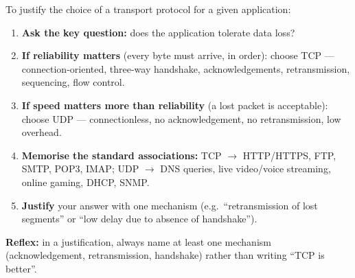 \documentclass[11pt]{article}
\newcommand{\cle}[1]{{\popxbold\color{popdark}#1}}
\begin{document}
\begin{methode}
To justify the choice of a transport protocol for a given application:
\begin{enumerate}
\item \textbf{Ask the key question:} does the application tolerate data loss?
\item \textbf{If reliability matters} (every byte must arrive, in order): choose \cle{TCP} — connection-oriented, three-way handshake, acknowledgements, retransmission, sequencing, flow control.
\item \textbf{If speed matters more than reliability} (a lost packet is acceptable): choose \cle{UDP} — connectionless, no acknowledgement, no retransmission, low overhead.
\item \textbf{Memorise the standard associations:} TCP $\rightarrow$ HTTP/HTTPS, FTP, SMTP, POP3, IMAP; UDP $\rightarrow$ DNS queries, live video/voice streaming, online gaming, DHCP, SNMP.
\item \textbf{Justify} your answer with one mechanism (e.g.\ ``retransmission of lost segments'' or ``low delay due to absence of handshake'').
\end{enumerate}
\textbf{Reflex:} in a justification, always name at least one mechanism (acknowledgement, retransmission, handshake) rather than writing ``TCP is better''.
\end{methode}
\end{document}
